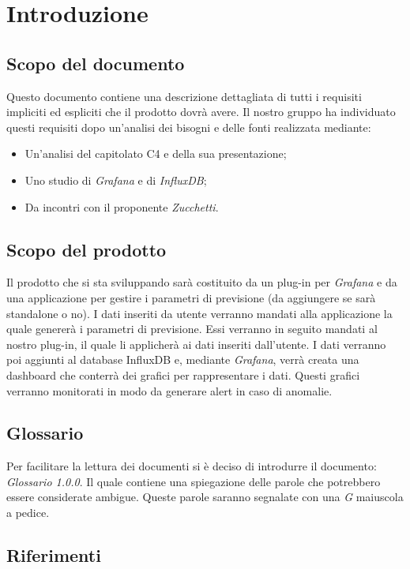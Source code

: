 \documentclass[a4]{article}
\begin{document}
	\section{Introduzione}
		\subsection{Scopo del documento}
			Questo documento contiene una descrizione dettagliata di tutti i requisiti impliciti ed espliciti che il prodotto dovrà avere. Il nostro gruppo ha individuato questi requisiti dopo un'analisi dei bisogni e delle fonti realizzata mediante: 
				\begin{itemize}
					\item Un'analisi del capitolato C4 e della sua presentazione; 
					\item Uno studio di \textit{Grafana} e di \textit{InfluxDB};
					\item Da incontri con il proponente \textit{Zucchetti}.
				\end{itemize}
		\subsection{Scopo del prodotto}
			Il prodotto che si sta sviluppando sarà costituito da un plug-in per \textit{Grafana} e da una applicazione per gestire i parametri di previsione (da aggiungere se sarà standalone o no). I dati inseriti da utente verranno mandati alla applicazione la quale genererà i parametri di previsione. Essi verranno in seguito mandati al nostro plug-in, il quale li applicherà ai dati inseriti dall'utente. I dati verranno poi aggiunti al database InfluxDB e, mediante \textit{Grafana}, verrà creata una dashboard che conterrà dei grafici per rappresentare i dati. Questi grafici verranno monitorati in modo da generare alert in caso di anomalie.
		
		\subsection{Glossario}
			Per facilitare la lettura dei documenti si è deciso di introdurre il documento: \textit{Glossario 1.0.0}. Il quale contiene una spiegazione delle parole che potrebbero essere considerate ambigue. Queste parole saranno segnalate con una \textit{G} maiuscola a pedice. 
		\subsection{Riferimenti}
\end{document}
